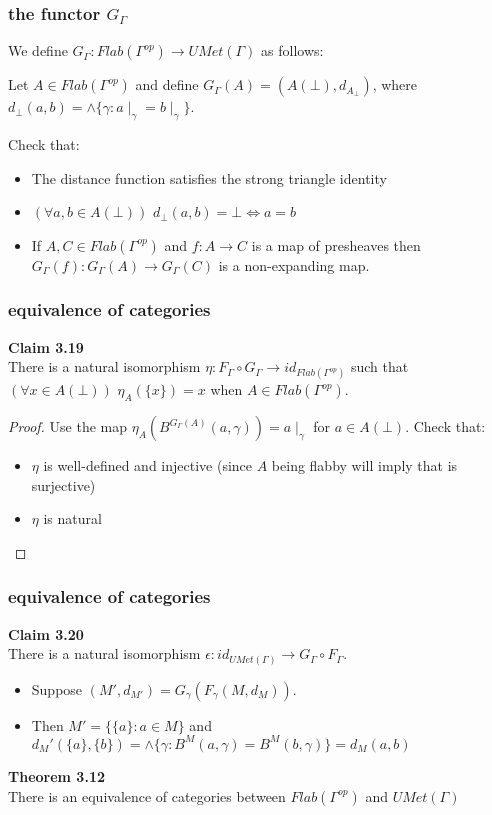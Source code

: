 \documentclass{beamer}
\begin{document}
\begin{frame}
\frametitle{the functor $G_\Gamma$}
We define $G_\Gamma: Flab(\Gamma^{op}) \rightarrow UMet(\Gamma)$ as follows:
	\begin{definition}
		Let $A \in Flab(\Gamma^{op})$ and define $G_\Gamma(A)=(A(\bot), d_{A_\bot})$, where $d_{\bot}(a,b) = \wedge\{\gamma:a\mid_\gamma = b\mid_\gamma\}$.
	\end{definition}
	
Check that:
	\begin{itemize}
		\item The distance function satisfies the strong triangle identity
		\item $(\forall a,b \in A(\bot))$   $d_{\bot}(a,b) = \bot \iff a =b$
		\item If $A,C \in Flab(\Gamma^{op})$ and $f:A \rightarrow C$ is a map of presheaves then $G_\Gamma(f):G_\Gamma(A) \rightarrow G_\Gamma(C)$ is a non-expanding map.
			
	\end{itemize}
\end{frame}

\begin{frame}
\frametitle{equivalence of categories}	
\textbf{Claim 3.19}\\ 
There is a natural isomorphism $\eta: F_\Gamma \circ G_\Gamma \rightarrow id_{Flab(\Gamma^{op})}$ such that $(\forall x \in A(\bot))$  $\eta_A(\{x\})=x$
when $A \in Flab(\Gamma^{op})$.
\begin{proof}
Use the map $\eta_A(B^{G_\Gamma(A)}(a,\gamma)) = a\mid_{\gamma}$ for $a \in A(\bot)$.
Check that:
\begin{itemize}
	\item $\eta$ is well-defined and injective (since $A$ being flabby will imply that is surjective)
	\item $\eta$ is natural
	\end{itemize}
	
\end{proof}
\end{frame}

\begin{frame}
\frametitle{equivalence of categories}
\textbf{Claim 3.20}\\
There is a natural isomorphism $\epsilon: id_{UMet(\Gamma)} \rightarrow G_\Gamma \circ F_\Gamma$. 


\begin{itemize}
	\item Suppose $(M',d_{M'})=G_\gamma(F_\gamma(M,d_M))$. 
	\item Then $M'=\{\{a\}: a \in M\}$ and $d_M'(\{a\},\{b\}) =\wedge\{\gamma:B^M(a,\gamma)=B^M(b,\gamma)\}=d_M(a,b)$
\end{itemize}

\textbf{Theorem 3.12}\\
There is an equivalence of categories between $Flab(\Gamma^{op})$ and $UMet(\Gamma)$
\end{frame}
\end{document}
